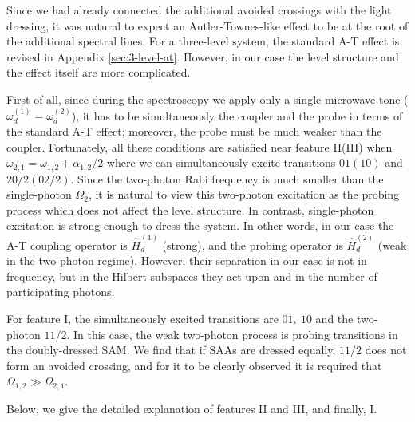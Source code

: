 \documentclass[%
 aps, prx,
 amsmath,amssymb,
 reprint,%
superscriptaddress
]{revtex4-2}
\begin{document}
Since we had already connected the additional 
avoided crossings with the light dressing, it was 
natural to expect an Autler-Townes-like effect to 
be at the root of the additional spectral lines. 
For a three-level system, the standard A-T effect 
is revised in Appendix \ref{sec:3-level-at}. 
However, in our case the level structure and the 
effect itself are more complicated. 

First of all, since during the spectroscopy we 
apply only a single microwave tone ($\omega_d^{(1)} = 
\omega_d^{(2)}$), it has to be 
simultaneously the coupler and the probe
in terms of the standard A-T effect; moreover, the 
probe must be much weaker than the coupler. 
Fortunately, all these conditions are satisfied near feature II(III) when 
$\omega_{2,1} = 
\omega_{1,2}+\alpha_{1,2}/2$  where we 
can simultaneously excite transitions $01 (10)$ 
and $20/2 (02/2)$. Since the two-photon Rabi 
frequency is much smaller than the single-photon 
$\Omega_2$, it is natural to view this two-photon 
excitation as the probing process which does not 
affect the level structure. In contrast, 
single-photon excitation is strong enough to 
dress the system. In other words, in our case the 
A-T coupling operator is $\hat H_{d}^{(1)}$ (strong), 
and the probing operator is $\hat H_{d}^{(2)}$ (weak 
in the two-photon regime). However, their 
separation in our case is not in frequency, but 
in the Hilbert subspaces they act upon and in the number of participating photons.

For feature I, the simultaneously 
excited transitions are $01,\ 10$ and the 
two-photon $11/2$. In this case, the weak two-photon process is probing transitions in the doubly-dressed SAM. We find that if SAAs are dressed equally, $11/2$ does not form an avoided crossing, and for it to be clearly observed it is required that 
$\Omega_{1,2} \gg \Omega_{2,1}$. 

Below, we give the detailed explanation of features II and III, and finally, I.
\end{document}
